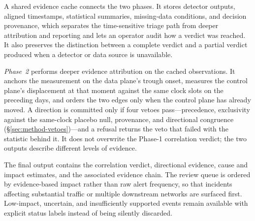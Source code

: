A shared evidence cache connects the two phases. It stores detector
outputs, aligned timestamps, statistical summaries, missing-data
conditions, and decision provenance, which separates the time-sensitive
triage path from deeper attribution and reporting and lets an operator
audit how a verdict was reached. It also preserves the distinction
between a complete verdict and a partial verdict produced when a
detector or data source is unavailable.

\emph{Phase~2} performs deeper evidence attribution on the cached
observations. It anchors the measurement on the data plane's trough
onset, measures the control plane's displacement at that moment against
the same clock slots on the preceding days, and orders the two edges only
when the control plane has already moved. A direction
is committed only if four vetoes pass---precedence, exclusivity against
the same-clock placebo null, provenance, and directional congruence
(\S\ref{sec:method-vetoes})---and a refusal returns the veto that failed
with the statistic behind it. It does not overwrite the Phase-1
correlation verdict; the two outputs describe different levels of
evidence.

The final output contains the correlation verdict, directional evidence,
cause and impact estimates, and the associated evidence chain. The review
queue is ordered by evidence-based impact rather than raw alert
frequency, so that incidents affecting substantial traffic or multiple
downstream networks are surfaced first. Low-impact, uncertain, and
insufficiently supported events remain available with explicit status
labels instead of being silently discarded.
